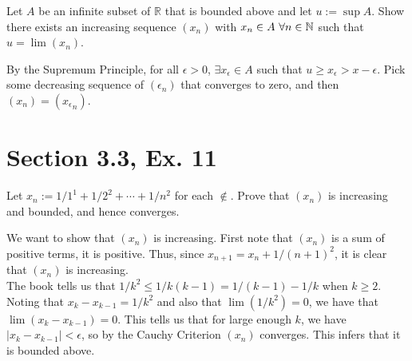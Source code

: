 \documentclass[paper=a4, fontsize=11pt]{scrartcl} %
\numberwithin{equation}{section} %
\numberwithin{figure}{section} %
\numberwithin{table}{section} %
\begin{document}
Let $A$ be an infinite subset of $\mathbb{R}$ that is bounded above and let $u := \sup A$. Show there exists an increasing sequence $(x_n)$ with $x_n \in A ~ \forall n \in \mathbb{N}$ such that $u = \lim(x_n)$.

\pf By the Supremum Principle, for all $\epsilon > 0$, $\exists x_\epsilon \in A$ such that $u \geq x_\epsilon > x - \epsilon$. Pick some decreasing sequence of $(\epsilon_n)$ that converges to zero, and then $(x_n) = ({x_\epsilon}_n)$. \done

\section*{Section 3.3, Ex. 11}

Let $x_n := 1/1^1 + 1/2^2 + \cdots + 1/n^2$ for each $\nin$. Prove that $(x_n)$ is increasing and bounded, and hence converges.

\pf We want to show that $(x_n)$ is increasing. First note that $(x_n)$ is a sum of positive terms, it is positive. Thus, since $x_{n+1} = x_n + 1/(n+1)^2$, it is clear that $(x_n)$ is increasing.\\

The book tells us that $1/k^2 \leq 1/k(k-1) = 1/(k-1) - 1/k$ when $k \geq 2$. Noting that $x_k - x_{k-1} = 1/k^2$ and also that $\lim(1/k^2) = 0$, we have that $\lim(x_k - x_{k-1}) = 0$. This tells us that for large enough $k$, we have $|x_k - x_{k-1}| < \epsilon$, so by the Cauchy Criterion $(x_n)$ converges. This infers that it is bounded above. \done
\end{document}

